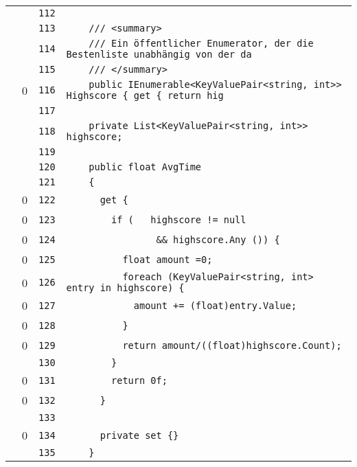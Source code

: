 \documentclass[a4paper,10pt]{article}
\begin{document}
\begin{longtable}[l]{lrrl}
\cellcolor{gray} &  & \verb~112~ & \verb~~\\
\cellcolor{gray} &  & \verb~113~ & \verb~    /// <summary>~\\
\cellcolor{gray} &  & \verb~114~ & \verb~    /// Ein öffentlicher Enumerator, der die Bestenliste unabhängig von der da~\\
\cellcolor{gray} &  & \verb~115~ & \verb~    /// </summary>~\\
\cellcolor{red} & 0 & \verb~116~ & \verb~    public IEnumerable<KeyValuePair<string, int>> Highscore { get { return hig~\\
\cellcolor{gray} &  & \verb~117~ & \verb~~\\
\cellcolor{gray} &  & \verb~118~ & \verb~    private List<KeyValuePair<string, int>> highscore;~\\
\cellcolor{gray} &  & \verb~119~ & \verb~~\\
\cellcolor{gray} &  & \verb~120~ & \verb~    public float AvgTime~\\
\cellcolor{gray} &  & \verb~121~ & \verb~    {~\\
\cellcolor{red} & 0 & \verb~122~ & \verb~      get {~\\
\cellcolor{red} & 0 & \verb~123~ & \verb~        if (   highscore != null~\\
\cellcolor{red} & 0 & \verb~124~ & \verb~                && highscore.Any ()) {~\\
\cellcolor{red} & 0 & \verb~125~ & \verb~          float amount =0;~\\
\cellcolor{red} & 0 & \verb~126~ & \verb~          foreach (KeyValuePair<string, int> entry in highscore) {~\\
\cellcolor{red} & 0 & \verb~127~ & \verb~            amount += (float)entry.Value;~\\
\cellcolor{red} & 0 & \verb~128~ & \verb~          }~\\
\cellcolor{red} & 0 & \verb~129~ & \verb~          return amount/((float)highscore.Count);~\\
\cellcolor{gray} &  & \verb~130~ & \verb~        }~\\
\cellcolor{red} & 0 & \verb~131~ & \verb~        return 0f;~\\
\cellcolor{red} & 0 & \verb~132~ & \verb~      }~\\
\cellcolor{gray} &  & \verb~133~ & \verb~~\\
\cellcolor{red} & 0 & \verb~134~ & \verb~      private set {}~\\
\cellcolor{gray} &  & \verb~135~ & \verb~    }~\\

\end{longtable}
\end{document}
